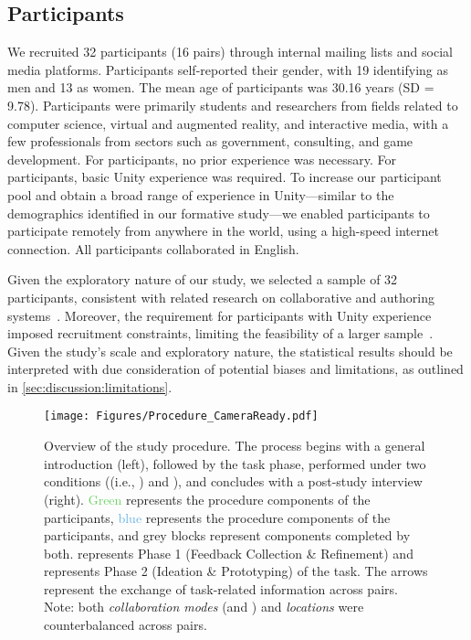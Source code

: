 \subsection{Participants}
We recruited 32 participants (16 pairs) through internal mailing lists and social media platforms. Participants self-reported their gender, with 19 identifying as men and 13 as women. The mean age of participants was 30.16 years (SD = 9.78). Participants were primarily students and researchers from fields related to computer science, virtual and augmented reality, and interactive media, with a few professionals from sectors such as government, consulting, and game development.
For \insitu participants, no prior experience was necessary. For \exsitu participants, basic Unity experience was required. To increase our participant pool and obtain a broad range of experience in Unity---similar to the demographics identified in our formative study---we enabled \exsitu participants to participate remotely from anywhere in the world, using a high-speed internet connection. All participants collaborated in English.

Given the exploratory nature of our study, we selected a sample of 32 participants, consistent with related research on collaborative and authoring systems~\cite{thoravikumaravelTransceiVRBridgingAsymmetrical2020, thoravikumaravelLokiFacilitatingRemote2019, nebelingXRDirectorRoleBasedCollaborative2020}. Moreover, the requirement for participants with Unity experience imposed recruitment constraints, limiting the feasibility of a larger sample~\cite{lakensSampleSizeJustification2022}. Given the study’s scale and exploratory nature, the statistical results should be interpreted with due consideration of potential biases and limitations, as outlined in \cref{sec:discussion:limitations}.

\begin{figure*}
    \centering
    \texttt{[image: Figures/Procedure\_CameraReady.pdf]}
    \caption{Overview of the study procedure. The process begins with a general introduction (left), followed by the task phase, performed under two conditions (\sync (i.e., \SystemName) and \async), and concludes with a post-study interview (right). \textcolor[HTML]{6DD268}{Green} represents the procedure components of the \insitu participants, \textcolor[HTML]{67B3E6}{blue} represents the procedure components of the \exsitu participants, and \textcolor[HTML]{6e6e6e}{grey} blocks represent components completed by both.  represents Phase 1 (Feedback Collection \& Refinement) and  represents Phase 2 (Ideation \& Prototyping) of the task. The arrows represent the exchange of task-related information across pairs. Note: both \textit{collaboration modes} (\sync and \async) and \textit{locations} were counterbalanced across pairs.}
    \label{fig:study-procedure}
\end{figure*}

